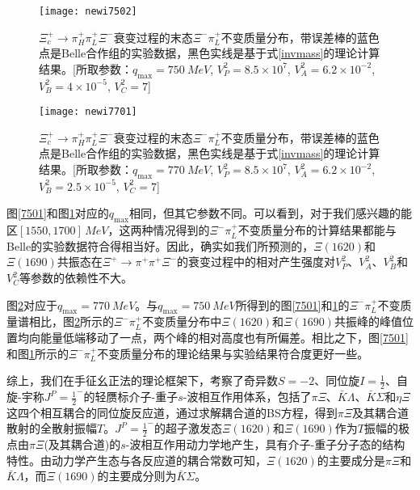 \begin{figure}[!h]
	\centering
	\texttt{[image: newi7502]}
	\begin{spacing}{1.5}
\caption[$\Xi^{-}\pi^{+}$不变质量分布(第二组参数)]{$\Xi_{c}^{+}\to\pi^{+}_{H}\pi^{+}_{L}\Xi^{-}$衰变过程的末态$\Xi^{-}\pi_{L}^{+}$不变质量分布，带误差棒的蓝色点是Belle合作组的实验数据\cite{PhysRevLett.122.072501}，黑色实线是基于式\eqref{invmass}的理论计算结果。[所取参数：$q_{\text{max}}=\SI{750}{MeV}$, $V_{P}^2=8.5\times10^7$, $V_A^2=6.2\times10^{-2}$, $V_B^2=4\times10^{-5}$, $V_C^2=7$]}
\end{spacing}
	\label{7502}
\end{figure}
\begin{figure}[!h]
	\centering
	\texttt{[image: newi7701]}
	\begin{spacing}{1.5}
\caption[$\Xi^{-}\pi^{+}$不变质量分布(第三组参数)]{$\Xi_{c}^{+}\to\pi^{+}_{H}\pi^{+}_{L}\Xi^{-}$衰变过程的末态$\Xi^{-}\pi_{L}^{+}$不变质量分布，带误差棒的蓝色点是Belle合作组的实验数据\cite{PhysRevLett.122.072501}，黑色实线是基于式\eqref{invmass}的理论计算结果。[所取参数：$q_{\text{max}}=\SI{770}{MeV}$, $V_{P}^2=8.5\times10^7$, $V_A^2=6.2\times10^{-2}$, $V_B^2=2.5\times10^{-5}$, $V_C^2=7$]}
\end{spacing}
	\label{7701}
\end{figure}\par\newpage
图\ref{7501}和图\ref{7502}对应的$q_{\text{max}}$相同，但其它参数不同。可以看到，对于我们感兴趣的能区$[1550,1700]\,\si{MeV}$，这两种情况得到的$\Xi^{-}\pi_{L}^{+}$不变质量分布的计算结果都能与Belle的实验数据符合得相当好。因此，确实如我们所预测的，$\Xi(1620)$和$\Xi(1690)$共振态在$\Xi^{+}\to\pi^{+}\pi^{+}\Xi^{-}$的衰变过程中的相对产生强度对$V_{P}^2$、$V_{A}^2$、$V_{B}^2$和$V_{C}^2$等参数的依赖性不大。\par
图\ref{7701}对应于$q_{\text{max}}=\SI{770}{MeV}$。与$q_{\text{max}}=\SI{750}{MeV}$所得到的图\ref{7501}和\ref{7502}的$\Xi^{-}\pi_{L}^{+}$不变质量谱相比，图\ref{7701}所示的$\Xi^{-}\pi^{+}_{L}$不变质量分布中$\Xi(1620)$和$\Xi(1690)$共振峰的峰值位置均向能量低端移动了一点，两个峰的相对高度也有所偏差。相比之下，图\ref{7501}和图\ref{7502}所示的$\Xi^{-}\pi_{L}^{+}$不变质量分布的理论结果与实验结果符合度更好一些。\par
综上，我们在手征幺正法的理论框架下，考察了奇异数$S=-2$、同位旋$I=\frac{1}{2}$、自旋-宇称$J^{P}=\frac{1}{2}^{-}$的轻赝标介子-重子$s$-波相互作用体系，包括了$\pi\Xi$、$\bar{K}\Lambda$、$\bar{K}\Sigma$和$\eta\Xi$这四个相互耦合的同位旋反应道，通过求解耦合道的BS方程，得到$\pi\Xi$及其耦合道散射的全散射振幅$T$。$J^{P}=\frac{1}{2}^{-}$的超子激发态$\Xi(1620)$和$\Xi(1690)$作为$T$振幅的极点由$\pi\Xi$(及其耦合道)的$s$-波相互作用动力学地产生，具有介子-重子分子态的结构特性。由动力学产生态与各反应道的耦合常数可知，$\Xi(1620)$的主要成分是$\pi\Xi$和$\bar{K}\Lambda$，而$\Xi(1690)$的主要成分则为$\bar{K}\Sigma$。\par
